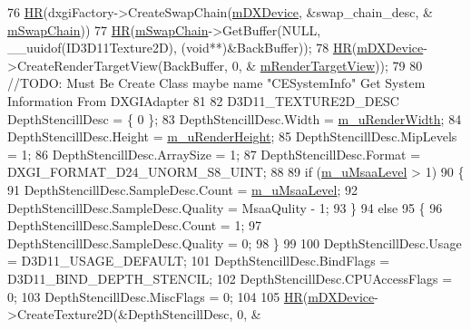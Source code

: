 \begin{DoxyCode}
76     \hyperlink{_comet_engine_d_x_renderer_8cpp_a924cd8cbf81756869040aed04fd33ca5}{HR}(dxgiFactory->CreateSwapChain(\hyperlink{class_comet_engine_1_1_renderer_1_1_comet_engine_d_x_renderer_ac606b85554250d2e65a2aa9f10e6aa45}{mDXDevice}, &swap\_chain\_desc, &
      \hyperlink{class_comet_engine_1_1_renderer_1_1_comet_engine_d_x_renderer_a501ef6e0fe112727e82e727997af01c6}{mSwapChain}))
77     \hyperlink{_comet_engine_d_x_renderer_8cpp_a924cd8cbf81756869040aed04fd33ca5}{HR}(\hyperlink{class_comet_engine_1_1_renderer_1_1_comet_engine_d_x_renderer_a501ef6e0fe112727e82e727997af01c6}{mSwapChain}->GetBuffer(NULL, \_\_uuidof(ID3D11Texture2D), (\textcolor{keywordtype}{void}**)&BackBuffer));
78     \hyperlink{_comet_engine_d_x_renderer_8cpp_a924cd8cbf81756869040aed04fd33ca5}{HR}(\hyperlink{class_comet_engine_1_1_renderer_1_1_comet_engine_d_x_renderer_ac606b85554250d2e65a2aa9f10e6aa45}{mDXDevice}->CreateRenderTargetView(BackBuffer, 0, &
      \hyperlink{class_comet_engine_1_1_renderer_1_1_comet_engine_d_x_renderer_a109e138c97280440a0955d475441f49d}{mRenderTargetView}));
79 
80     \textcolor{comment}{//TODO: Must Be Create Class maybe name "CESystemInfo" Get System Information From DXGIAdapter}
81 
82     D3D11\_TEXTURE2D\_DESC    DepthStencillDesc = \{ 0 \};
83     DepthStencillDesc.Width = \hyperlink{class_comet_engine_1_1_renderer_1_1_comet_engine_d_x_renderer_a3127a8dc19e4bd799fa7e1bfff28de11}{m\_uRenderWidth};
84     DepthStencillDesc.Height = \hyperlink{class_comet_engine_1_1_renderer_1_1_comet_engine_d_x_renderer_af8f780a50f9325d3bad66c1ba49ed533}{m\_uRenderHeight};
85     DepthStencillDesc.MipLevels = 1;
86     DepthStencillDesc.ArraySize = 1;
87     DepthStencillDesc.Format = DXGI\_FORMAT\_D24\_UNORM\_S8\_UINT;
88 
89     \textcolor{keywordflow}{if} (\hyperlink{class_comet_engine_1_1_renderer_1_1_comet_engine_d_x_renderer_aee26a00f9adfbcf0a5de3a91ec7e322d}{m\_uMsaaLevel} > 1)
90     \{
91         DepthStencillDesc.SampleDesc.Count = \hyperlink{class_comet_engine_1_1_renderer_1_1_comet_engine_d_x_renderer_aee26a00f9adfbcf0a5de3a91ec7e322d}{m\_uMsaaLevel};
92         DepthStencillDesc.SampleDesc.Quality = MsaaQulity - 1;
93     \}
94     \textcolor{keywordflow}{else}
95     \{
96         DepthStencillDesc.SampleDesc.Count = 1;
97         DepthStencillDesc.SampleDesc.Quality = 0;
98     \}
99 
100     DepthStencillDesc.Usage = D3D11\_USAGE\_DEFAULT;
101     DepthStencillDesc.BindFlags = D3D11\_BIND\_DEPTH\_STENCIL;
102     DepthStencillDesc.CPUAccessFlags = 0;
103     DepthStencillDesc.MiscFlags = 0;
104 
105     \hyperlink{_comet_engine_d_x_renderer_8cpp_a924cd8cbf81756869040aed04fd33ca5}{HR}(\hyperlink{class_comet_engine_1_1_renderer_1_1_comet_engine_d_x_renderer_ac606b85554250d2e65a2aa9f10e6aa45}{mDXDevice}->CreateTexture2D(&DepthStencillDesc, 0, &

\end{DoxyCode}
